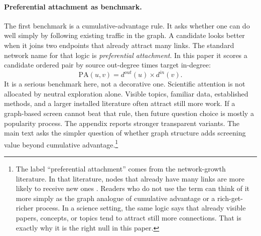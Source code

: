 \documentclass[11pt]{article}
\begin{document}
\paragraph{Preferential attachment as benchmark.} The first benchmark is a cumulative-advantage rule. It asks whether one can do well simply by following existing traffic in the graph. A candidate looks better when it joins two endpoints that already attract many links. The standard network name for that logic is \emph{preferential attachment}. In this paper it scores a candidate ordered pair by source out-degree times target in-degree:
\[
\mathrm{PA}(u,v)=d^{out}(u)\times d^{in}(v).
\]
It is a serious benchmark here, not a decorative one. Scientific attention is not allocated
by neutral exploration alone. Visible topics, familiar data, established methods, and a
larger installed literature often attract still more work. If a graph-based screen cannot
beat that rule, then future question choice is mostly a popularity process. The appendix
reports stronger transparent variants. The main text asks the simpler question of whether
graph structure adds screening value beyond cumulative advantage.\footnote{The label
``preferential attachment'' comes from the network-growth literature. In that literature,
nodes that already have many links are more likely to receive new ones
\citep{price1976general,barabasi1999emergence}. Readers who do not use the term can think of
it more simply as the graph analogue of cumulative advantage or a rich-get-richer process.
In a science setting, the same logic says that already visible papers, concepts, or topics
tend to attract still more connections. That is exactly why it is the right null in this
paper.}
\end{document}
